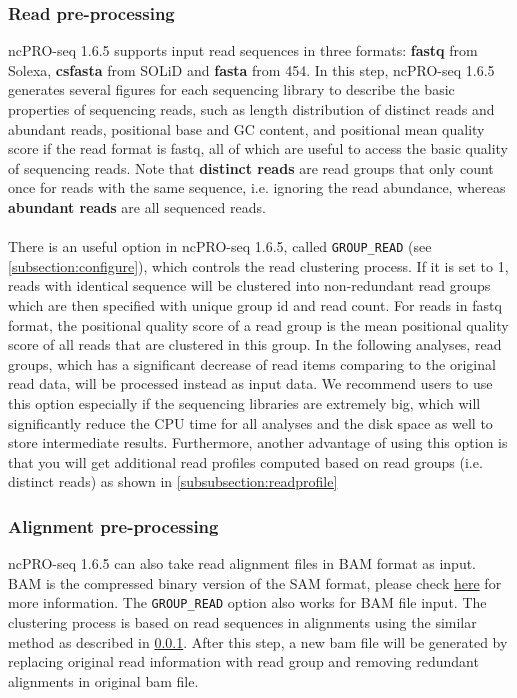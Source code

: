 \documentclass[12pt]{article}
\def \ncpip{ncPRO-seq 1.6.5}
\begin{document}
\subsubsection{Read pre-processing}
\label{subsubsection:readpreprocess}
\ncpip{} supports input read sequences in three formats: \textbf{fastq} from Solexa, \textbf{csfasta} from SOLiD  and \textbf{fasta} from 454. In this step, \ncpip{} generates several figures for each sequencing library to describe the basic properties of sequencing reads, such as length distribution of distinct reads and abundant reads, positional base and GC content, and positional mean quality score if the read format is fastq, all of which are useful to access the basic quality of sequencing reads. Note that \textbf{distinct reads} are read groups that only count once for reads with the same sequence, i.e. ignoring the read abundance, whereas \textbf{abundant reads} are all sequenced reads. \\\\
There is an useful option in \ncpip{}, called \verb+GROUP_READ+ (see \ref{subsection:configure}), which controls the read clustering process. If it is set to 1, reads with identical sequence will be clustered into non-redundant read groups which are then specified with unique group id and read count. For reads in fastq format, the positional quality score of a read group is the mean positional quality score of all reads that are clustered in this group. In the following analyses, read groups, which has a significant decrease of read items comparing to the original read data, will be processed instead as input data. We recommend users to use this option especially if the sequencing libraries are extremely big, which will significantly reduce the CPU time for all analyses and the disk space as well to store intermediate results. Furthermore, another advantage of using this option is that you will get additional read profiles computed based on read groups (i.e. distinct reads) as shown in \ref{subsubsection:readprofile} 

\subsubsection{Alignment pre-processing}
\ncpip{} can also take read alignment files in BAM format as input. BAM is the compressed binary version of the SAM format, please check \href{http://samtools.sourceforge.net/}{ here} for more information. The \verb+GROUP_READ+ option also works for BAM file input. The clustering process is based on read sequences in alignments using the similar method as described in \ref{subsubsection:readpreprocess}. After this step, a new bam file will be generated by replacing original read information with read group and removing redundant alignments in original bam file.
\end{document}
